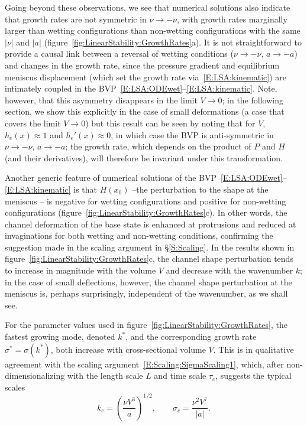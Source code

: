 \documentclass{jfm}
\newcommand{\blue}[1]{{\color{blue} #1}}
\newcommand{\aspect}{a} %
\begin{document}
Going beyond these observations, we see that numerical solutions also indicate that growth rates are not symmetric in $\nu \to -\nu$, with growth rates marginally larger than wetting configurations than non-wetting configurations with the same $|\nu|$ and $|\aspect|$ (figure~\ref{fig:LinearStability:GrowthRates}a). It is not straightforward to provide a causal link between a reversal of wetting conditions ($\nu \to -\nu$, $a \to -a$) and changes in the growth rate, since the pressure gradient and equilibrium meniscus displacement (which set the growth rate via~\eqref{E:LSA:kinematic}) are intimately coupled in the BVP~\eqref{E:LSA:ODEwet}--\eqref{E:LSA:kinematic}. Note, however, that this asymmetry disappears in the limit $V \to 0$; in the following section, we show this explicitly in the case of small deformations (a case that covers the limit $V \to 0$) but this result can be seen by noting that for $V$, $h_e(x)\approx 1$ and $h_e'(x) \approx 0$, in which case the BVP is anti-symmetric in $\nu \to -\nu$, $a \to -a$; the growth rate, which depends on the product of $P$ and $H$ (and their derivatives), will therefore be invariant under this transformation. %

Another generic feature of numerical solutions of the BVP~\eqref{E:LSA:ODEwet}--\eqref{E:LSA:kinematic} is that $H(x_0)$ --the perturbation to the shape at the meniscus -- is negative for wetting configurations and positive for non-wetting configurations (figure~\ref{fig:LinearStability:GrowthRates}c). In other words, the channel deformation of the base state is enhanced at protrusions and reduced at invaginations for both wetting and non-wetting conditions, confirming the suggestion made in the scaling argument in \S\ref{S:Scaling}. In the results shown in figure~\ref{fig:LinearStability:GrowthRates}c, the channel shape perturbation tends to increase in magnitude with the volume $V$ and decrease with the wavenumber $k$; in the case of small deflections, however, the channel shape perturbation at the meniscus is, perhaps surprisingly, independent of the wavenumber, as we shall see. 

For the parameter values used in figure~\ref{fig:LinearStability:GrowthRates}, the fastest growing mode, denoted $k^*$, and the corresponding growth rate $\sigma^* = \sigma(k^*)$, both increase with cross-sectional volume $V$. This is in qualitative agreement with the scaling argument~\eqref{E:Scaling:SigmaScaling1}, which, after non-dimensionalizing with the length scale $L$ and time scale $\tau_c$, suggests the typical scales
\begin{equation}\label{E:LSA:DimensionlessScalings}
k_c  = \left(\frac{\nu V^3}{a}\right)^{1/2}, \qquad \sigma_c = \frac{\nu^2 V^7}{|a|}.
\end{equation}
\end{document}
